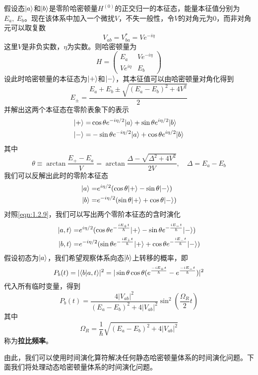 假设态$ |a\rangle $和$ |b\rangle $是零阶哈密顿量$ H^{(0)} $的正交归一的本征态，能量本征值分别为$ E_a,\ E_b $。现在该体系中加入一个微扰$ V $，不失一般性，令$ V $的对角元为0，而非对角元可以取复数
\begin{equation}\label{key}
V_{ab}=V_{ba}^*=Ve^{-i\eta}
\end{equation}
这里$ V $是非负实数，$ \eta $为实数。则哈密顿量为
\begin{equation}\label{key}
H=\begin{pmatrix}
E_a&Ve^{-i\eta}\\Ve^{i\eta}&E_b
\end{pmatrix}
\end{equation}
设此时哈密顿量的本征态为$ |+\rangle $和$ |-\rangle $，其本征值可以由哈密顿量对角化得到
\begin{equation}\label{key}
E_\pm=\dfrac{E_a+E_b\pm\sqrt{(E_a-E_b)^2+4V^2}}{2}
\end{equation}
并解出这两个本征态在零阶表象下的表示
\begin{align}
|+\rangle=&\cos\theta e^{-i\eta/2}|a\rangle+\sin\theta e^{i\eta/2}|b\rangle\\
|-\rangle=&-\sin\theta e^{-i\eta/2}|a\rangle+\cos\theta e^{i\eta/2}|b\rangle
\end{align}
其中
\begin{equation}\label{key}
\theta\equiv\arctan\dfrac{E_+-E_a}{V}=\arctan\dfrac{\Delta-\sqrt{\Delta^2+4V^2}}{2V},\quad \Delta=E_a-E_b
\end{equation}
我们可以反解出此时的零阶本征态
\begin{align}
|a\rangle=&e^{i\eta/2}(\cos\theta|+\rangle-\sin\theta|-\rangle)\\
|b\rangle=&e^{-i\eta/2}(\sin\theta|+\rangle+\cos\theta|-\rangle)
\end{align}
对照\eqref{eqn:1.2.9}，我们可以写出两个零阶本征态的含时演化
\begin{align}
|a,t\rangle=&e^{i\eta/2}(\cos\theta e^{-\frac{iE_+t}{\hbar}}|+\rangle-\sin\theta e^{-\frac{iE_-t}{\hbar}}|-\rangle)\\
|b,t\rangle=&e^{-i\eta/2}(\sin\theta e^{-\frac{iE_+t}{\hbar}}|+\rangle+\cos\theta e^{-\frac{iE_-t}{\hbar}}|-\rangle)
\end{align}
假设初态为$ |a\rangle $，我们希望观察体系向态$ |b\rangle $上转移的概率，即
\begin{equation}\label{key}
P_b(t)=|\langle b|a,t\rangle|^2=|\sin\theta\cos\theta(e^{\frac{-iE_+t}{\hbar}}-e^{\frac{-iE_-t}{\hbar}})|^2
\end{equation}
代入所有临时变量，得到
\begin{equation}\label{key}
P_b(t)=\dfrac{4|V_{ab}|^2}{(E_a-E_b)^2+4|V_{ab}|^2}\sin^2\left(\dfrac{\Omega_R}{2}t\right)
\end{equation}
其中
\begin{equation}\label{key}
\Omega_R=\frac{1}{\hbar}\sqrt{(E_a-E_b)^2+4|V_{ab}|^2}
\end{equation}
称为\textbf{拉比频率}。

由此，我们可以使用时间演化算符解决任何静态哈密顿量体系的时间演化问题。下面我们将处理动态哈密顿量体系的时间演化问题。